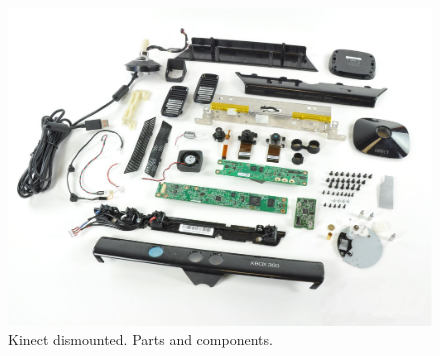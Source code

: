 \begin{figure}[h]
	\begin{center}
	\includegraphics[scale=0.2]{img/kinect/kinect_parts.eps}
	\caption[Kinect Parts]{Kinect dismounted. Parts and components.}
	\end{center}
\end{figure}



